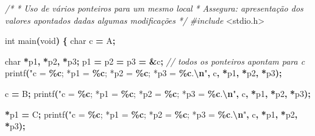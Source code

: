 \documentclass[
  11pt,
  a4paper,
]{scrbook}
\newenvironment{Shaded}{\begin{snugshade}}{\end{snugshade}}
\newcommand{\CharTok}[1]{\textcolor[rgb]{0.31,0.60,0.02}{#1}}
\newcommand{\CommentTok}[1]{\textcolor[rgb]{0.56,0.35,0.01}{\textit{#1}}}
\newcommand{\DataTypeTok}[1]{\textcolor[rgb]{0.13,0.29,0.53}{#1}}
\newcommand{\ImportTok}[1]{#1}
\newcommand{\NormalTok}[1]{#1}
\newcommand{\OperatorTok}[1]{\textcolor[rgb]{0.81,0.36,0.00}{\textbf{#1}}}
\newcommand{\PreprocessorTok}[1]{\textcolor[rgb]{0.56,0.35,0.01}{\textit{#1}}}
\newcommand{\SpecialCharTok}[1]{\textcolor[rgb]{0.81,0.36,0.00}{\textbf{#1}}}
\newcommand{\StringTok}[1]{\textcolor[rgb]{0.31,0.60,0.02}{#1}}
\begin{document}
\begin{Shaded}
\begin{Highlighting}[]
\CommentTok{/*}
\CommentTok{ * Uso de vários ponteiros para um mesmo local}
\CommentTok{ * Assegura: apresentação dos valores apontados dadas algumas modificações}
\CommentTok{ */}
\PreprocessorTok{\#include }\ImportTok{\textless{}stdio.h\textgreater{}}

\DataTypeTok{int}\NormalTok{ main}\OperatorTok{(}\DataTypeTok{void}\OperatorTok{)} \OperatorTok{\{}
    \DataTypeTok{char}\NormalTok{ c }\OperatorTok{=} \CharTok{\textquotesingle{}A\textquotesingle{}}\OperatorTok{;}

    \DataTypeTok{char} \OperatorTok{*}\NormalTok{p1}\OperatorTok{,} \OperatorTok{*}\NormalTok{p2}\OperatorTok{,} \OperatorTok{*}\NormalTok{p3}\OperatorTok{;}
\NormalTok{    p1 }\OperatorTok{=}\NormalTok{ p2 }\OperatorTok{=}\NormalTok{ p3 }\OperatorTok{=} \OperatorTok{\&}\NormalTok{c}\OperatorTok{;}  \CommentTok{// todos os ponteiros apontam para c}
\NormalTok{    printf}\OperatorTok{(}\StringTok{"c = }\SpecialCharTok{\%c}\StringTok{; *p1 = }\SpecialCharTok{\%c}\StringTok{; *p2 = }\SpecialCharTok{\%c}\StringTok{; *p3 = }\SpecialCharTok{\%c}\StringTok{.}\SpecialCharTok{\textbackslash{}n}\StringTok{"}\OperatorTok{,}\NormalTok{ c}\OperatorTok{,} \OperatorTok{*}\NormalTok{p1}\OperatorTok{,} \OperatorTok{*}\NormalTok{p2}\OperatorTok{,} \OperatorTok{*}\NormalTok{p3}\OperatorTok{);}

\NormalTok{    c }\OperatorTok{=} \CharTok{\textquotesingle{}B\textquotesingle{}}\OperatorTok{;}
\NormalTok{    printf}\OperatorTok{(}\StringTok{"c = }\SpecialCharTok{\%c}\StringTok{; *p1 = }\SpecialCharTok{\%c}\StringTok{; *p2 = }\SpecialCharTok{\%c}\StringTok{; *p3 = }\SpecialCharTok{\%c}\StringTok{.}\SpecialCharTok{\textbackslash{}n}\StringTok{"}\OperatorTok{,}\NormalTok{ c}\OperatorTok{,} \OperatorTok{*}\NormalTok{p1}\OperatorTok{,} \OperatorTok{*}\NormalTok{p2}\OperatorTok{,} \OperatorTok{*}\NormalTok{p3}\OperatorTok{);}

    \OperatorTok{*}\NormalTok{p1 }\OperatorTok{=} \CharTok{\textquotesingle{}C\textquotesingle{}}\OperatorTok{;}
\NormalTok{    printf}\OperatorTok{(}\StringTok{"c = }\SpecialCharTok{\%c}\StringTok{; *p1 = }\SpecialCharTok{\%c}\StringTok{; *p2 = }\SpecialCharTok{\%c}\StringTok{; *p3 = }\SpecialCharTok{\%c}\StringTok{.}\SpecialCharTok{\textbackslash{}n}\StringTok{"}\OperatorTok{,}\NormalTok{ c}\OperatorTok{,} \OperatorTok{*}\NormalTok{p1}\OperatorTok{,} \OperatorTok{*}\NormalTok{p2}\OperatorTok{,} \OperatorTok{*}\NormalTok{p3}\OperatorTok{);}


\end{Highlighting}
\end{Shaded}
\end{document}
